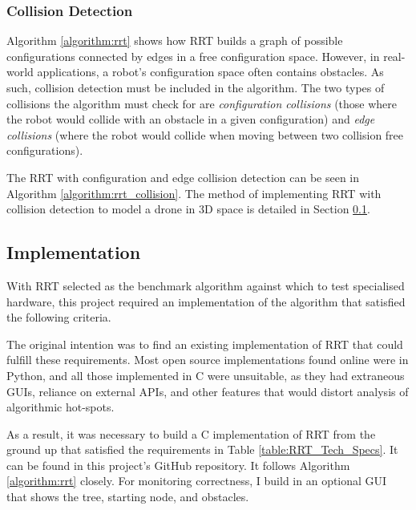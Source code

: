         

    \subsubsection{Collision Detection}

        Algorithm \ref{algorithm:rrt} shows how \ac{RRT} builds a graph of possible configurations connected by edges in a free configuration space. However, in real-world applications, a robot's configuration space often contains obstacles. As such, collision detection must be included in the algorithm. The two types of collisions the algorithm must check for are \textit{configuration collisions} (those where the robot would collide with an obstacle in a given configuration) and \textit{edge collisions} (where the robot would collide when moving between two collision free configurations).

        The RRT with configuration and edge collision detection can be seen in Algorithm \ref{algorithm:rrt_collision}. The method of implementing \ac{RRT} with collision detection to model a drone in 3D space is detailed in Section \ref{section:implementation}.

        

\newpage
\subsection{Implementation}\label{section:implementation}
    
    With \ac{RRT} selected as the benchmark algorithm against which to test specialised hardware, this project required an implementation of the algorithm that satisfied the following criteria.

    

    The original intention was to find an existing implementation of RRT that could fulfill these requirements. Most open source implementations found online were in Python, and all those implemented in C were unsuitable\cite{RoboJackets2019}\cite{Planning2019}\cite{Sourishg2017}\cite{Vss2sn2019}, as they had extraneous \ac{GUI}s, reliance on external \ac{API}s, and other features that would distort analysis of algorithmic hot-spots.

    As a result, it was necessary to build a C implementation of RRT from the ground up that satisfied the requirements in Table \ref{table:RRT_Tech_Specs}. It can be found in this project's GitHub repository. It follows Algorithm \ref{algorithm:rrt} closely. For monitoring correctness, I build in an optional \ac{GUI} that shows the tree, starting node, and obstacles.

